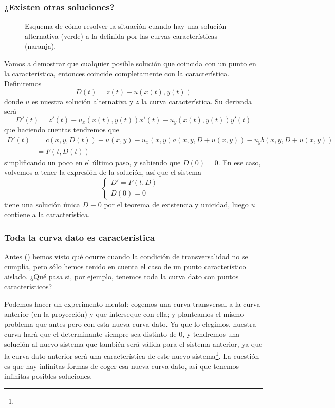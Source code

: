 \subsubsection{¿Existen otras soluciones?}

\begin{figure}[hbtp]
\centering
{}
\caption{Esquema de cómo resolver la situación cuando hay una solución alternativa (verde) a la definida por las curvas características (naranja).}
\label{fig:SolucionesAlternativasCaracteristica}
\end{figure}

Vamos a demostrar que cualquier posible solución que coincida con un punto en la característica, entonces coincide completamente con la característica. Definiremos \[ D(t) = z(t) - u(x(t), y(t))\] donde $u$ es nuestra solución alternativa y $z$ la curva característica. Su derivada será \[ D'(t) = z'(t) - u_x(x(t), y(t)) x'(t) - u_y(x(t), y(t)) y'(t)\] que haciendo cuentas tendremos que \begin{align*} D'(t) &= c(x, y, D(t)) + u(x,y)-u_x(x,y) a(x,y, D+u(x,y)) - u_yb(x,y, D + u(x,y)) \\
&= F(t, D(t)) %
\end{align*} simplificando un poco en el último paso, y sabiendo que $D(0) = 0$. En ese caso, volvemos a tener la expresión de la solución, así que el sistema \[ \begin{cases} D'= F(t,D) & \\ D(0) = 0 & \end{cases} \] tiene una solución única $D \equiv 0$ por el teorema de existencia y unicidad, luego $u$ contiene a la característica.


\subsubsection{Toda la curva dato es característica}

Antes () hemos visto qué ocurre cuando la condición de transversalidad no se cumplía, pero sólo hemos tenido en cuenta el caso de un punto característico aislado. ¿Qué pasa si, por ejemplo, tenemos toda la curva dato con puntos característicos?

Podemos hacer un experimento mental: cogemos una curva transversal a la curva anterior (en la proyección) y que interseque con ella; y planteamos el mismo problema que antes pero con esta nueva curva dato. Ya que lo elegimos, nuestra curva hará que el determinante siempre sea distinto de 0, y tendremos una solución al nuevo sistema que también será válida para el sistema anterior, ya que la curva dato anterior será una característica de este nuevo sistema\footnote{}. La cuestión es que hay infinitas formas de coger esa nueva curva dato, así que tenemos infinitas posibles soluciones.

